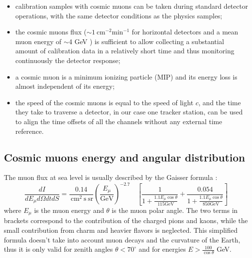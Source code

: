  

\begin{itemize}
    \item calibration samples with cosmic muons 
    can be taken during standard detector operations, 
    with the same detector conditions as the physics samples;
    \item the cosmic muons flux 
    ($\sim 1 \ \text{cm}^{-2} \text{min}^{-1}$ 
    for horizontal detectors and a mean
    muon energy of $\sim$4 GeV \cite{muonflux}) 
    is sufficient to allow
    collecting a substantial amount of calibration 
    data in a relatively short time and 
    thus monitoring continuously the detector response;
    \item a cosmic muon is a minimum ionizing 
    particle (MIP) and 
    its energy loss is almost 
    independent of its energy;
    \item the speed of the cosmic muons is equal to the 
    speed of light $c$, and the time they take to traverse 
    a detector, in our case one tracker station, can be 
    used to align the time offsets of all the channels  
    without any external time reference.
\end{itemize}
\subsection{Cosmic muons energy and angular distribution}\label{distcos}
The muon flux at sea level is usually described by the Gaisser formula \cite{guan2015parametrization}:
\begin{equation}
    \frac{d I}{d E_\mu d \Omega d t d S}=\frac{0.14}{\mathrm{~cm}^2 \mathrm{~s} \ \mathrm{sr}}\left(\frac{E_\mu}{\mathrm{GeV}}\right)^{-2.7} \quad\left[\frac{1}{1+\frac{1.1 E_\mu \cos \theta}{115 \mathrm{GeV}}}+\frac{0.054}{1+\frac{1.1 E_\mu \cos \theta}{850 \mathrm{GeV}}}\right]
    \end{equation}
where $E_\mu$ is the muon energy and $\theta$ is the muon polar angle. 
The two terms in brackets correspond to the contribution of the charged pions and kaons, while 
the small contribution from charm and heavier flavors is neglected. 
This simplified formula doesn't take into account muon decays and the curvature of the Earth, 
thus it is only valid for zenith angles $\theta < 70^\circ$
and for energies $E > \frac{100}{\cos \theta}$ GeV.

